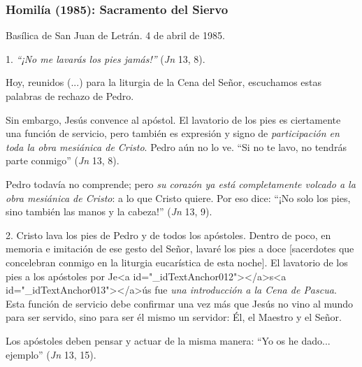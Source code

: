 			\subsubsection{Homilía (1985): Sacramento del Siervo}
			
			\begin{referencia}Basílica de San Juan de Letrán. 4 de abril de 1985.\end{referencia}
			
			\begin{body} 1. \textit{“¡No me lavarás los pies jamás!”} (\textit{Jn }13, 8). \end{body}
			
			\begin{body}Hoy, reunidos (...) para la liturgia de la Cena del Señor, escuchamos estas palabras de rechazo de Pedro. \end{body}
			
			\begin{body}Sin embargo, Jesús convence al apóstol. El lavatorio de los pies es ciertamente una función de servicio, pero también es expresión y signo de \textit{participación en toda la obra mesiánica de Cristo}. Pedro aún no lo ve. “Si no te lavo, no tendrás parte conmigo” (\textit{Jn} 13, 8). \end{body}
			
			\begin{body}Pedro todavía no comprende; pero \textit{su corazón ya está completamente volcado a la obra mesiánica de Cristo}: a lo que Cristo quiere. Por eso dice: “¡No solo los pies, sino también las manos y la cabeza!” (\textit{Jn} 13, 9). \end{body}
			
			\begin{body}2. Cristo lava los pies de Pedro y de todos los apóstoles. Dentro de poco, en memoria e imitación de ese gesto del Señor, lavaré los pies a doce [sacerdotes que concelebran conmigo en la liturgia eucarística de esta noche]. El lavatorio de los pies a los apóstoles por Je<a id="_idTextAnchor012"></a>s<a id="_idTextAnchor013"></a>ús fue \textit{una introducción a la Cena de Pascua}. Esta función de servicio debe confirmar una vez más que Jesús no vino al mundo para ser servido, sino para ser él mismo un servidor: Él, el Maestro y el Señor. \end{body}
			
			\begin{body}Los apóstoles deben pensar y actuar de la misma manera: “Yo os he dado... ejemplo” (\textit{Jn }13, 15). \end{body}
			
